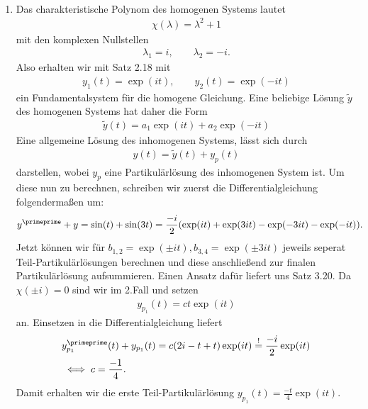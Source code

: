 \begin{solution}
\leavevmode \\
\begin{enumerate}[label = \textbf{\alph*)}]
  \item Das charakteristische Polynom des homogenen Systems lautet
  \begin{align*}
    \chi(\lambda) = \lambda^2 + 1
  \end{align*}
  mit den komplexen Nullstellen
  \begin{align*}
    \lambda_1 = i, \qquad \lambda_2 = -i.
  \end{align*}
  Also erhalten wir mit Satz 2.18 mit
  \begin{align*}
    y_1(t) = \exp(it), \qquad y_2(t) = \exp(-it)
  \end{align*}
  ein Fundamentalsystem für die homogene Gleichung.
  Eine beliebige Lösung $\widetilde{y}$ des homogenen Systems hat daher die Form
  \begin{align*}
    \widetilde{y}(t) = a_1\exp(it) + a_2\exp(-it)
  \end{align*}
  Eine allgemeine Lösung des inhomogenen Systems, lässt sich durch
  \begin{align*}
    y(t) = \widetilde{y}(t) + y_p(t)
  \end{align*}
  darstellen, wobei $y_p$ eine Partikulärlösung des inhomogenen System ist.
  Um diese nun zu berechnen, schreiben wir zuerst die Differentialgleichung folgendermaßen um:
  \begin{align*}
    y^{\primeprime} + y &= \sin(t) + \sin(3t)
    = \frac{-i}{2}(\exp(it) + \exp(3it) - \exp(-3it) - \exp(-it)).
  \end{align*}
  Jetzt können wir für $b_{1,2} = \exp(\pm it), b_{3,4} = \exp(\pm 3it)$
  jeweils seperat Teil-Partikulärlösungen berechnen und diese anschließend zur finalen Partikulärlösung
  aufsummieren. Einen Ansatz dafür liefert uns Satz 3.20. Da $\chi(\pm i) = 0$ sind wir im 2.Fall und
  setzen
  \begin{align*}
    y_{p_1}(t) = ct\exp(it)
  \end{align*}
  an. Einsetzen in die Differentialgleichung liefert
  \begin{align*}
    &y_{p_1}^{\primeprime}(t) + y_{p_1}(t) = c(2i - t + t)\exp(it)\stackrel{!}{=}
    \frac{-i}{2}\exp(it) \\
    &\iff c = \frac{-1}{4}.
  \end{align*}
  Damit erhalten wir die erste Teil-Partikulärlösung $y_{p_1}(t) = \frac{-t}{4}\exp(it)$. \\

\end{enumerate}
\end{solution}
